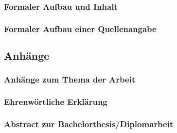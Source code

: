 \subsubsection{Formaler Aufbau und Inhalt}
\label{formal-gestaltung-quellenverzeichnis-inhalt}
\subsubsection{Formaler Aufbau einer Quellenangabe}
\label{formal-gestaltung-quellenverzeichnis-quelle}
\subsection{Anhänge}
\label{formal-gestaltung-anhaenge}
\subsubsection{Anhänge zum Thema der Arbeit}
\label{formal-gestaltung-anhaenge-anhaenge}
\subsubsection{Ehrenwörtliche Erklärung}
\label{formal-gestaltung-anhaenge-erklaerung}
\subsubsection{Abstract zur Bachelorthesis/Diplomarbeit}
\label{formal-gestaltung-anhaenge-abstract}
